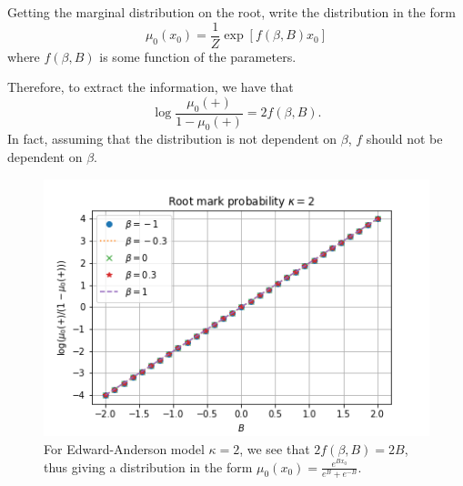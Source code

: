 \documentclass[12pt]{article}
\numberwithin{equation}{section}
\begin{document}
Getting the marginal distribution on the root, write the distribution in the form
\begin{equation*}
    \mu_0(x_0) = \frac1Z\exp[f(\beta, B)x_0]
\end{equation*}
where $f(\beta, B)$ is some function of the parameters.

Therefore, to extract the information, we have that
\begin{equation*}
    \log \frac{\mu_0(+)}{1 - \mu_0(+)} = 2f(\beta, B).
\end{equation*}
In fact, assuming that the distribution is not dependent on $\beta$, $f$ should not be dependent on $\beta$.
\begin{figure}[h]
    \centering
    \includegraphics[width=12cm]{img/EA_x0_B_logisitic_kappa_2.png}
    \caption{For Edward-Anderson model $\kappa=2$, we see that $2f(\beta, B) = 2B$, thus giving a distribution in the form $\mu_0(x_0) = \frac{e^{Bx_0}}{e^B + e^{-B}}$. }
    \label{Fig.EA-x0-B-logisitic}
\end{figure}
\end{document}

